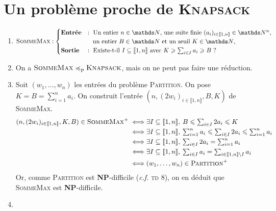 \section{Un problème proche de \textsc{Knapsack}}

\begin{enumerate}
	\item
		\[
			\textsc{SommeMax} : \begin{cases}
				\text{\textbf{Entrée}}&: \text{ Un entier $n\in \N$, une suite finie $(a_i)_{i\in\llbracket 1,n \rrbracket} \in \N^n$,}\\
															&\phantom{:}\:\text{ un entier $B \in \N$\/ et un seuil $K \in \N$,}\\
				\text{\textbf{Sortie}}&: \text{ Existe-t-il $I \subseteq \llbracket 1,n \rrbracket$\/ avec $K \ge \sum_{i \in I} a_i \ge B$\/ ?}
			\end{cases}
		\]
	\item On a $\textsc{SommeMax} \preceq_\mathrm{p} \textsc{Knapsack}$, mais on ne peut pas faire une réduction.
	\item Soit $(w_1, \ldots, w_n)$\/ les entrées du problème \textsc{Partition}.
		On pose $K = B = \sum_{i=1}^n a_i$. On construit l'entrée $(n, (2w_i)_{i \in \llbracket 1,n \rrbracket}, B, K)$\/ de \textsc{SommeMax}.
		\begin{align*}
			(n, (2w_i)_{i \in \llbracket 1,n \rrbracket}, K, B) \in \textsc{SommeMax}^+
			\iff&\ts\exists I \subseteq \llbracket 1,n \rrbracket,\: B \le \sum_{i \in I} 2a_i \le K \\
			\iff&\ts\exists I \subseteq \llbracket 1,n \rrbracket,\: \sum_{i=1}^n a_i \le \sum_{i \in I} 2a_i \le \sum_{i = 1}^n a_i \\
			\iff&\ts\exists I \subseteq \llbracket 1,n \rrbracket,\: \sum_{i \in I} 2a_i = \sum_{i=1}^n a_i  \\
			\iff&\ts \exists I \subseteq \llbracket 1,n \rrbracket,\: \sum_{i \in I} a_i = \sum_{i \in \llbracket 1,n \rrbracket \setminus I} a_i \\
			\iff& (w_1,\ldots,w_n) \in \textsc{Partition}^+ \\
		\end{align*}
		Or, comme \textsc{Partition} est \textbf{NP}-difficile (\textit{c.f.} \textsc{td} 8), on en déduit que \textsc{SommeMax} est \textbf{NP}-difficile.
	\item~\\[-1.5\baselineskip]
		\begin{algorithm}[H]
			\centering
			\begin{algorithmic}[1]

\end{algorithmic}
\end{algorithm}
\end{enumerate}
